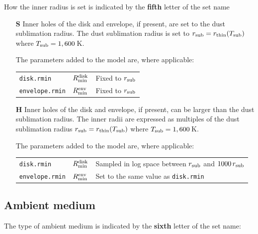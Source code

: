\documentclass[10pt]{article}
\newcommand{\rmind}{R^{\rm disk}_{\rm min}}
\newcommand{\rmine}{R^{\rm env}_{\rm min}}
\begin{document}
How the inner radius is set is indicated by the \textbf{fifth} letter of the set name

\begin{itemize}

\item[\textbf{S}] Inner holes of the disk and envelope, if present, are set to the dust sublimation radius. The dust sublimation radius is set to $r_{\rm sub} = r_{\rm thin}(T_{\rm sub})$ where $T_{\rm sub}=1,600$\,K.

The parameters added to the model are, where applicable:

\begin{center}
  \begin{tabular}{llp{4in}}
    \texttt{disk.rmin} & $\rmind$ & Fixed to $r_{\rm sub}$ \\
    \texttt{envelope.rmin} & $\rmine$ & Fixed to $r_{\rm sub}$ \\
  \end{tabular}
\end{center}

\item[\textbf{H}] Inner holes of the disk and envelope, if present, can be larger than the dust sublimation radius. The inner radii are expressed as multiples of the dust sublimation radius $r_{\rm sub} = r_{\rm thin}(T_{\rm sub})$ where $T_{\rm sub}=1,600$\,K.

The parameters added to the model are, where applicable:

\begin{center}
  \begin{tabular}{llp{4in}}
    \texttt{disk.rmin} & $\rmind$ & Sampled in log space between $r_{\rm sub}$ and $1000\,r_{\rm sub}$ \\
    \texttt{envelope.rmin} & $\rmine$ & Set to the same value as \texttt{disk.rmin} \\
  \end{tabular}
\end{center}

\end{itemize}

\subsection{Ambient medium}

The type of ambient medium is indicated by the \textbf{sixth} letter of the set name:
\end{document}
